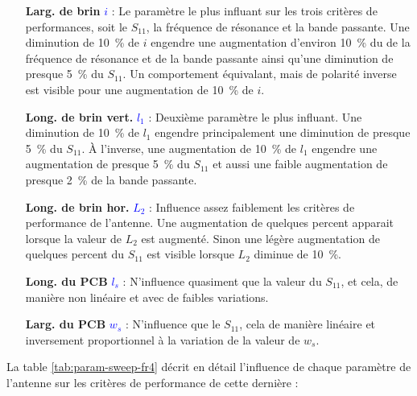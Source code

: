 \documentclass[Deriaz_Traiber_Labo02]{subfiles}
\begin{document}
\begin{itemize}
\item [\textbf{Larg. de brin }\textcolor{blue}{$i$}  ] : Le paramètre le plus influant sur les trois critères de performances, soit le $S_{11}$, la fréquence de résonance et la bande passante. Une diminution de \SI{10}{\percent} de $i$ engendre une augmentation d'environ \SI{10}{\percent} du de la fréquence de résonance et de la bande passante ainsi qu'une diminution de presque \SI{5}{\percent} du $S_{11}$. Un comportement équivalant, mais de polarité inverse est visible pour une augmentation de \SI{10}{\percent} de $i$.\\

\item [\textbf{Long. de brin vert. }\textcolor{blue}{$l_1$}] : Deuxième paramètre le plus influant. Une diminution de \SI{10}{\percent} de $l_1$ engendre principalement une diminution de presque \SI{5}{\percent} du $S_{11}$. À l'inverse, une augmentation de \SI{10}{\percent} de $l_1$ engendre une augmentation de presque \SI{5}{\percent} du $S_{11}$ et aussi une faible augmentation de presque \SI{2}{\percent} de la bande passante.\\

\item [\textbf{Long. de brin hor.  }\textcolor{blue}{$L_2$}] : Influence assez faiblement les critères de performance de l'antenne. Une augmentation de quelques \si{percent} apparait lorsque la valeur de $L_2$ est augmenté. Sinon une légère augmentation de quelques \si{percent} du $S_{11}$ est visible lorsque $L_2$ diminue de \SI{10}{\percent}.\\ 

\item [\textbf{Long. du PCB }\textcolor{blue}{$l_s$}] : N'influence quasiment que la valeur du $S_{11}$, et cela, de manière non linéaire et avec de faibles variations.\\

\item [\textbf{Larg. du PCB  }\textcolor{blue}{$w_s$}] : N'influence que le $S_{11}$, cela de manière linéaire et inversement proportionnel à la variation de la valeur de $w_s$.\\
\end{itemize}

\pagebreak

La table \ref{tab:param-sweep-fr4} décrit en détail l'influence de chaque paramètre de l'antenne sur les critères de performance de cette dernière :
\end{document}
